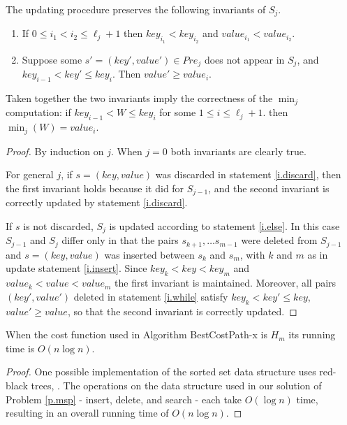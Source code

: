 \begin{theorem}\label{p.kmu} The updating procedure preserves the following invariants of $S_j$.
  \begin{enumerate}
  	\item If $0\leq i_1< i_2 \leq \ell_j+1$ then $key_{i_1}< key_{i_2}$ and 
  	$value_{i_1} < value_{i_2}$.
  	\item Suppose some $s'=(key',value') \in Pre_j$ does not appear in $S_j$, and
  	$key_{i-1} < key' \leq key_i$. Then $value'\geq value_i$.
   \end{enumerate}
   Taken together the two invariants imply the correctness of the $\min_j$ computation: if $key_{i-1}<W\leq key_{i}$ for some $1\leq i \leq \ell_j+1$. then 
  	$\min_j(W)=value_{i}$.
\end{theorem}
\begin{proof}
By induction on $j$. When $j=0$ both invariants are clearly true.

For general $j$, if $s=(key,value)$ was discarded in statement \ref{i.discard}, then the first invariant holds because it did for $S_{j-1}$, and the second invariant is correctly updated
by statement \ref{i.discard}. 

If $s$ is not discarded, $S_j$ is updated according to statement \ref{i.else}. In this case $S_{j-1}$ and $S_j$ differ only in that 
the pairs $s_{k+1},\ldots s_{m-1}$ were deleted from $S_{j-1}$ and $s=(key,value)$ was
inserted between $s_k$ and $s_m$, with $k$ and $m$ as in
update statement \ref{i.insert}. Since $key_k<key <key_m$ and 
$value_k < value <value_m$ the first invariant is maintained.
Moreover, all pairs $(key',value')$
deleted in statement \ref{i.while}
satisfy $key_k<key'\leq key$, $value'\geq value$, so that the second invariant is correctly
updated.
\end{proof}
\begin{theorem}
	When the cost function used in Algorithm BestCostPath-x is $H_m$ its running time is $O(n\log n)$.
\end{theorem}
\begin{proof}
One possible implementation of the sorted set data structure uses red-black trees, \cite{guibas}.
The operations on the data structure used in our solution of Problem \ref{p.msp} -  insert, delete, and search - each take $O(\log n)$ time, resulting 
in an overall running time of $O(n \log n)$.
\end{proof}


